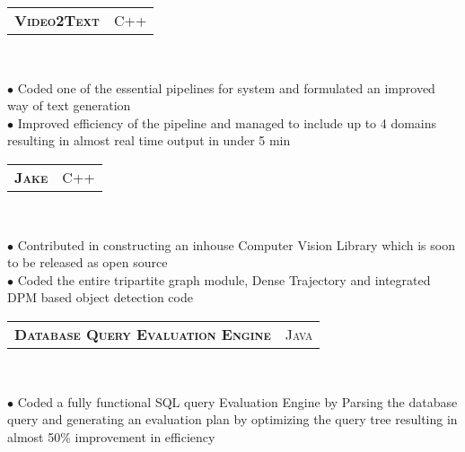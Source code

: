 \documentclass[10pt,a4paper,oneside]{article}
\begin{document}
\begin{minipage}[t]{0.63\textwidth}
\begin{adjustwidth}{7pt}{0pt}
        \end{adjustwidth}
        \begin{tabular}{c|c}
            \textbf{\normalsize V\textsc{ideo}2T\textsc{ext}}
            &\textmd{\normalsize C\textsc{++}}
        \end{tabular}\\
        \vspace{-4mm}
        \begin{adjustwidth}{7pt}{0pt}
            {\footnotesize $\bullet$ Coded one of the essential pipelines for system and formulated an improved way of text generation\\
            $\bullet$ Improved efficiency of the pipeline and managed to include up to 4 domains resulting in almost real time output in under 5 min}\\ 
        \end{adjustwidth}
        \begin{tabular}{c|c}
            \textbf{\normalsize J\textsc{ake}}
            &\textmd{\normalsize C\textsc{++}}
        \end{tabular}\\
         \vspace{-4mm}
        \begin{adjustwidth}{7pt}{0pt}
            {\footnotesize $\bullet$ Contributed in constructing an inhouse Computer Vision Library which is soon to be released as open
                source\\
            $\bullet$ Coded the entire tripartite graph module, Dense Trajectory and integrated DPM based object detection code}\\
        \end{adjustwidth}
        \begin{tabular}{c|c}
            \textbf{\normalsize D\textsc{atabase} Q\textsc{uery}
            E\textsc{valuation} E\textsc{ngine}}
            &\textmd{\normalsize J\textsc{ava}}
        \end{tabular}\\
         \vspace{-4mm}
        \begin{adjustwidth}{7pt}{0pt}
            {\footnotesize $\bullet$ Coded a fully functional SQL query Evaluation Engine by Parsing the database query and generating an evaluation plan by optimizing the query tree resulting in almost 50\% improvement in efficiency}\\
        \end{adjustwidth}
   \end{minipage}
\end{document}
